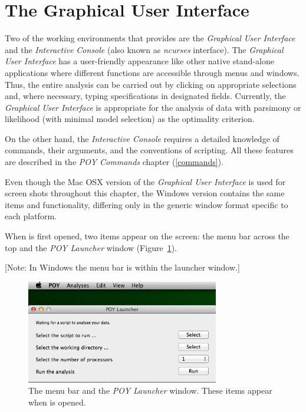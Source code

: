 
\section{The Graphical User Interface}

Two of the working environments that \poy provides are the \emph{Graphical User Interface} and the 
\emph{Interactive Console} (also known as  \emph{ncurses} interface). The \emph{Graphical User 
Interface} has a user-friendly appearance like other native stand-alone applications where different 
functions are accessible through menus and windows. Thus, the entire analysis can be 
carried out by clicking on appropriate selections and, where necessary, typing specifications in 
designated fields. Currently, the \emph{Graphical User Interface} is appropriate for the analysis of 
data with parsimony or likelihood (with minimal model selection) as the optimality criterion.  

On the other hand, the \emph{Interactive Console} requires a detailed knowledge of \poy commands, 
their arguments, and the conventions of \poy scripting. All these features are described in the 
\emph{POY Commands} chapter (\ref{commands}).

Even though the Mac OSX version of the \emph{Graphical User Interface} is used for screen 
shots throughout this chapter, the Windows version contains the same items and 
functionality, differing only in the generic window format specific to each platform.

When \poy is first opened, two items appear on the screen: the \poy menu bar across the top and the 
\emph{POY Launcher} window (Figure~\ref{fig:menu_launcher_window}). 

[Note: In Windows the menu bar is within the launcher window.]

\begin{figure}[htpb]
    \begin{center}
        \includegraphics[width=0.75\textwidth]{doc/figures/menu_launcher_window.jpg}
    \end{center}
    \caption{The \poy menu bar and the \emph{POY Launcher} window. These items appear when \poy is opened.}
    \label{fig:menu_launcher_window}
\end{figure}

